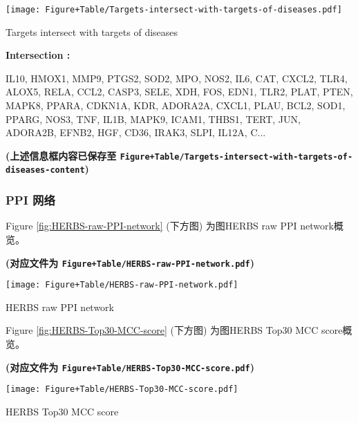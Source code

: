 \documentclass[
]{article}
\begin{document}
\def\@captype{figure}
\begin{center}
\texttt{[image: Figure+Table/Targets-intersect-with-targets-of-diseases.pdf]}
\caption{Targets intersect with targets of diseases}\label{fig:Targets-intersect-with-targets-of-diseases}
\end{center}
\begin{center}\begin{tcolorbox}[colback=gray!10, colframe=gray!50, width=0.9\linewidth, arc=1mm, boxrule=0.5pt]
\textbf{
Intersection
:}

\vspace{0.5em}

    IL10, HMOX1, MMP9, PTGS2, SOD2, MPO, NOS2, IL6, CAT,
CXCL2, TLR4, ALOX5, RELA, CCL2, CASP3, SELE, XDH, FOS,
EDN1, TLR2, PLAT, PTEN, MAPK8, PPARA, CDKN1A, KDR, ADORA2A,
CXCL1, PLAU, BCL2, SOD1, PPARG, NOS3, TNF, IL1B, MAPK9,
ICAM1, THBS1, TERT, JUN, ADORA2B, EFNB2, HGF, CD36, IRAK3,
SLPI, IL12A, C...

\vspace{2em}
\end{tcolorbox}
\end{center}

\textbf{(上述信息框内容已保存至 \texttt{Figure+Table/Targets-intersect-with-targets-of-diseases-content})}

\hypertarget{ppi-ux7f51ux7edc}{%
\subsubsection{PPI 网络}\label{ppi-ux7f51ux7edc}}

Figure \ref{fig:HERBS-raw-PPI-network} (下方图) 为图HERBS raw PPI network概览。

\textbf{(对应文件为 \texttt{Figure+Table/HERBS-raw-PPI-network.pdf})}

\def\@captype{figure}
\begin{center}
\texttt{[image: Figure+Table/HERBS-raw-PPI-network.pdf]}
\caption{HERBS raw PPI network}\label{fig:HERBS-raw-PPI-network}
\end{center}

Figure \ref{fig:HERBS-Top30-MCC-score} (下方图) 为图HERBS Top30 MCC score概览。

\textbf{(对应文件为 \texttt{Figure+Table/HERBS-Top30-MCC-score.pdf})}

\def\@captype{figure}
\begin{center}
\texttt{[image: Figure+Table/HERBS-Top30-MCC-score.pdf]}
\caption{HERBS Top30 MCC score}\label{fig:HERBS-Top30-MCC-score}
\end{center}
\end{document}
